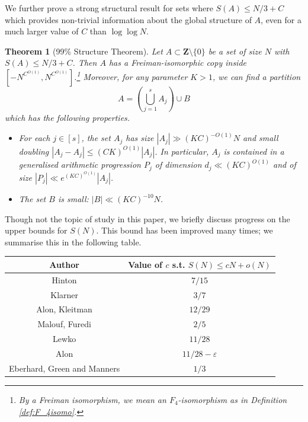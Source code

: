 \documentclass[11pt, reqno]{amsart}
\newtheorem{theorem}{Theorem}[section]
\begin{document}
We further prove a strong structural result for sets where $S(A)\leqslant N/3+C$ which provides non-trivial information about the global structure of $A$, even for a much larger value of $C$ than $\log\log N$.
\begin{theorem}[99\% Structure Theorem]\label{th:mainstructure}
    Let $A\subset\mathbf{Z}\setminus\{0\}$ be a set of size $N$ with $S(A)\leqslant N/3+C$. Then $A$ has a Freiman-isomorphic copy inside $[-N^{C^{O(1)}},N^{C^{O(1)}}]$.\footnote{By a Freiman isomorphism, we mean an $F_4$-isomorphism as in Definition \ref{def:F_4isomo}.} Moreover, for any parameter $K>1$, we can find a partition
\begin{equation}
A=\left(\bigcup_{j=1}^sA_j\right)\cup B
\end{equation}
which has the following properties.
\begin{itemize}
    \item [(i)] For each $j\in[s]$, the set $A_j$ has size $|A_j|\gg (KC)^{-O(1)}N$ and small doubling $|A_j-A_j|\leqslant (CK)^{O(1)}|A_j|$. In particular, $A_j$ is contained in a generalised arithmetic progression $P_j$ of dimension $d_j\ll (KC)^{O(1)}$ and of size $|P_j|\ll e^{(KC)^{O(1)}}|A_j|$.
    \item [(ii)] The set $B$ is small: $|B|\ll (KC)^{-10}N$.
\end{itemize}
\end{theorem}
Though not the topic of study in this paper, we briefly discuss progress on the upper bounds for $S(N)$. This bound has been improved many times; we summarise this in the following table.
\begin{center}
\begin{tabular}{ |c|c| } 
\hline
Author & Value of $c$ s.t. $S(N)\leqslant cN+o(N)$ \\
\hline
Hinton \cite{erdos} & $7/15$ \\
Klarner \cite{erdos} & $3/7$ \\
Alon, Kleitman \cite{alonkleitman} & $12/29$ \\
Malouf, Furedi \cite{malouf,guy} & $2/5$ \\
Lewko \cite{lewko} & $11/28$ \\
Alon \cite{alon} & $11/28-\varepsilon$ \\
Eberhard, Green and Manners \cite{eberhardgreenmanners} & $1/3$ \\
\hline
\end{tabular}
\end{center}
\end{document}
